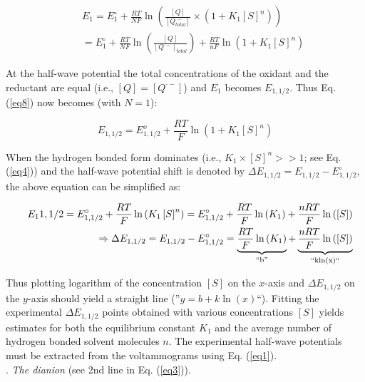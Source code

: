 \documentclass[byrevtex,amssymb,aps,pra,floatfix,letterpaper]{revtex4}
\begin{document}
\begin{eqnarray}
& & E_1 = E_1^\circ + \frac{RT}{NF}\ln\left(\frac{\left[Q\right]}{\left[Q^{\cdot-}_{total}\right]}\times\left(1 + K_1\left[S\right]^n\right)\right)\\
\nonumber
& & = E_1^\circ + \frac{RT}{NF}\ln\left(\frac{\left[Q\right]}{\left[Q^{\cdot-}\right]_{total}}\right) + \frac{RT}{nF}\ln\left(1 + K_1\left[S\right]^n\right)
\label{eq8}
\end{eqnarray}

\noindent
At the half-wave potential the total concentrations of the oxidant and the reductant are equal (i.e., $\left[Q\right] = \left[Q^{\cdot-}\right]$) and $E_1$ becomes $E_{1,1/2}$. Thus Eq. (\ref{eq8}) now becomes (with $N = 1$):

\begin{equation}
E_{1,1/2} = E_{1,1/2}^o + \frac{RT}{F}\ln\left(1 + K_1\left[S\right]^n\right)
\label{eq9}
\end{equation}

\noindent
When the hydrogen bonded form dominates (i.e., $K_1 \times \left[S\right]^n >> 1$; see Eq. (\ref{eq4})) and the half-wave potential shift is denoted by $\Delta E_{1,1/2} = E_{1,1/2} - E_{1,1/2}^\circ$, the above equation can be simplified as:

\begin{eqnarray}
& & E_1{1,1/2} = E_{1,1/2}^\circ + \frac{RT}{F}\ln\left(K_1\left[S\right]^n\right) = E_{1,1/2}^\circ + \frac{RT}{F}\ln\left(K_1\right) + \frac{nRT}{F}\ln\left(\left[S\right]\right)\\
\nonumber
& & \Rightarrow \Delta E_{1,1/2} = E_{1,1/2} - E_{1,1/2}^\circ = \underbrace{\frac{RT}{F}\ln\left(K_1\right)}_{\textnormal{``b''}} + \underbrace{\frac{nRT}{F}\ln\left(\left[S\right]\right)}_{\textnormal{``kln(x)``}}
\label{eq10}
\end{eqnarray}

\noindent
Thus plotting logarithm of the concentration $\left[S\right]$ on the $x$-axis and $\Delta E_{1,1/2}$ on the $y$-axis should yield a straight line (''$y = b + k\ln(x)$``). Fitting the experimental $\Delta E_{1,1/2}$ points obtained with various concentrations $\left[S\right]$ yields estimates for both the equilibrium
constant $K_1$ and the average number of hydrogen bonded solvent molecules $n$. The experimental half-wave potentials must be extracted from the voltammograms using Eq. (\ref{eq1}).\\

. \textit{The dianion} (see 2nd line in Eq. (\ref{eq3})).\\
\end{document}
